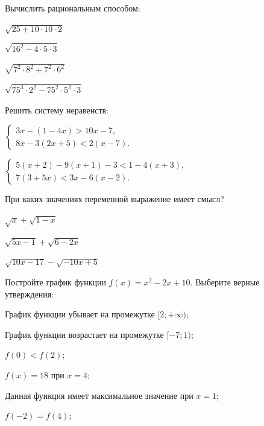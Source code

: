 \begin{homework}[number=1]
	\begin{listofex}
		\item Вычислить рациональным способом:
		\begin{enumcols}[itemcolumns=2]
			\item \( \sqrt{25+10\cdot10\cdot2} \)
			\item \( \sqrt{16^2-4\cdot5\cdot3} \)
			\item \( \sqrt{7^2\cdot8^2+7^2\cdot6^2} \)
			\item \( \sqrt{75^3\cdot2^2-75^2\cdot5^2\cdot3} \)
		\end{enumcols}
		\item Решить систему неравенств:
		\begin{enumcols}[itemcolumns=2]
			\item
			\( \left\{
			\begin{array}{l}
				3x-(1-4x)>10x-7,\\
				8x-3(2x+5)<2(x-7).
			\end{array}
			\right. \)
			\item
			\( \left\{
			\begin{array}{l}
				5(x+2)-9(x+1)-3<1-4(x+3),\\
				7(3+5x)<3x-6(x-2).
			\end{array}
			\right. \)
		\end{enumcols}
		\item При каких значениях переменной выражение имеет смысл?
		\begin{enumcols}[itemcolumns=3]
			\item \( \sqrt{x}+\sqrt{1-x} \)
			\item \( \sqrt{5x-1}+\sqrt{6-2x} \)
			\item \( \sqrt{10x-17}-\sqrt{-10x+5} \)
			\end{enumcols}
		\item Постройте график функции \( f(x)=x^2-2x+10 \). Выберите верные утверждения:
		\begin{enumcols}[itemcolumns=1]
			\item График функции убывает на промежутке \( [2;+\infty) \);
			\item График функции возрастает на промежутке \( [-7;1) \);
			\item \( f(0)<f(2) \);
			\item \( f(x)=18 \) при \( x=4 \);
			\item Данная функция имеет максимальное значение при \( x=1 \);
			\item \( f(-2)=f(4) \);

\end{enumcols}
\end{listofex}
\end{homework}
